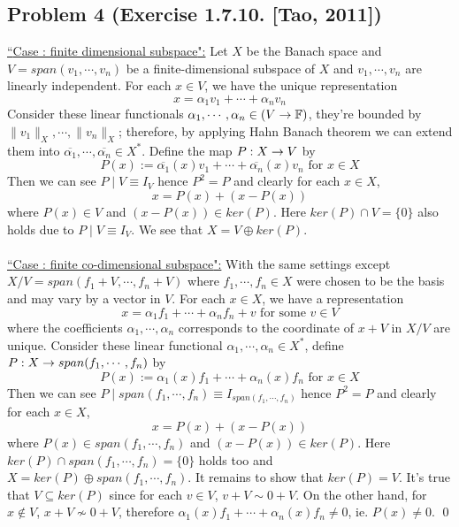 \documentclass[12pt,a4paper]{article}
\newcommand{\ra}[1]{\ifnum #1=1\rightarrow\fi\ifnum #1=2\Rightarrow\fi}
\newcommand{\onum}[1]{\raisebox{.5pt}{\textcircled{\raisebox{-1pt} {#1}}}}
\newcommand{\claim}[1]{\underline{``{#1}":}}
\begin{document}
\newpage\subsection*{Problem 4 (Exercise 1.7.10. [Tao, 2011])}
\claim{Case \onum1: finite dimensional subspace} Let $X$ be the Banach space and $V = span(v_1, \cdots, v_n)$ be a finite-dimensional subspace of $X$ and $v_1, \cdots, v_n$ are linearly independent. For each $x\in V$, we have the unique representation
$$x = \alpha_1 v_1 + \cdots + \alpha_n v_n$$
Consider these linear functionals $\alpha_1, \cdots, \alpha_n \in (V \ra1 \mathbb F)$, they're bounded by $\|v_1\|_X, \cdots, \|v_n\|_X$; therefore, by applying Hahn Banach theorem we can extend them into $\overline{\alpha_1}, \cdots, \overline{\alpha_n} \in X^\ast$. Define the map $P: X \ra1 V$ by
$$P(x) := \overline{\alpha_1}(x) v_1 + \cdots + \overline{\alpha_n}(x) v_n \text{ for }x \in X$$
Then we can see $P \mid V \equiv I_V$ hence $P^2 = P$ and clearly for each $x\in X$, 
$$x = P(x) + (x - P(x))$$
where $P(x) \in V$ and $(x - P(x)) \in ker(P)$. Here $ker(P) \cap V = \{0\}$ also holds due to $P\mid V \equiv I_V$. We see that $X = V \oplus ker(P)$. \\
\\
\claim{Case \onum2: finite co-dimensional subspace} With the same settings except $X/V = span(f_1 + V, \cdots, f_n+V)$ where $f_1, \cdots, f_n \in X$ were chosen to be the basis and may vary by a vector in $V$. For each $x\in X$, we have a representation 
$$x = \alpha_1 f_1 + \cdots + \alpha_n f_n + v \text{ for some } v\in V$$
where the coefficients $\alpha_1, \cdots, \alpha_n$ corresponds to the coordinate of $x + V$ in $X/V$ are unique. Consider these linear functional $\alpha_1, \cdots, \alpha_n \in X^\ast$, define $P: X \ra1 span(f_1, \cdots, f_n)$ by
$$P(x) := \alpha_1(x) f_1 + \cdots + \alpha_n(x) f_n \text{ for } x\in X$$
Then we can see $P \mid span(f_1, \cdots, f_n) \equiv I_{span(f_1, \cdots, f_n)}$ hence $P^2 = P$ and clearly for each $x\in X$, 
$$x = P(x) + (x-P(x))$$
where $P(x) \in span(f_1, \cdots, f_n)$ and $(x - P(x)) \in ker(P)$. Here $ker(P) \cap span(f_1, \cdots, f_n) = \{0\}$ holds too and $X = ker(P) \oplus span(f_1, \cdots, f_n)$. It remains to show that $ker(P) = V$. It's true that $V \subseteq ker(P)$ since for each $v\in V$, $v + V \sim 0 + V$. On the other hand, for $x \notin V$, $x + V \nsim 0+V$, therefore $\alpha_1(x) f_1 + \cdots + \alpha_n(x) f_n \neq 0$, ie. $P(x) \neq 0$. \qed
\end{document}
